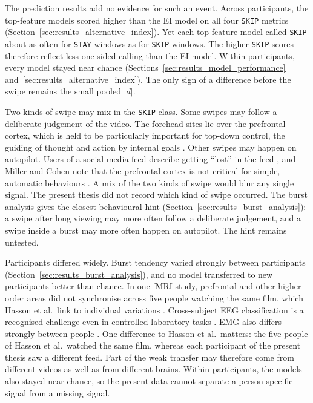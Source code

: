 \documentclass[12pt,a4paper]{report}
\begin{document}
The prediction results add no evidence for such an event. Across participants, the top-feature models scored higher than the EI model on all four \texttt{SKIP} metrics (Section~\ref{sec:results_alternative_index}). Yet each top-feature model called \texttt{SKIP} about as often for \texttt{STAY} windows as for \texttt{SKIP} windows. The higher \texttt{SKIP} scores therefore reflect less one-sided calling than the EI model. Within participants, every model stayed near chance (Sections~\ref{sec:results_model_performance} and~\ref{sec:results_alternative_index}). The only sign of a difference before the swipe remains the small pooled \(|d|\).

Two kinds of swipe may mix in the \texttt{SKIP} class. Some swipes may follow a deliberate judgement of the video. The forehead sites lie over the prefrontal cortex, which is held to be particularly important for top-down control, the guiding of thought and action by internal goals \cite{miller_integrative_2001}. Other swipes may happen on autopilot. Users of a social media feed describe getting ``lost'' in the feed \cite{baughan_i_2022}, and Miller and Cohen note that the prefrontal cortex is not critical for simple, automatic behaviours \cite{miller_integrative_2001}. A mix of the two kinds of swipe would blur any single signal. The present thesis did not record which kind of swipe occurred. The burst analysis gives the closest behavioural hint (Section~\ref{sec:results_burst_analysis}): a swipe after long viewing may more often follow a deliberate judgement, and a swipe inside a burst may more often happen on autopilot. The hint remains untested.

Participants differed widely. Burst tendency varied strongly between participants (Section~\ref{sec:results_burst_analysis}), and no model transferred to new participants better than chance. In one fMRI study, prefrontal and other higher-order areas did not synchronise across five people watching the same film, which Hasson et al.\ link to individual variations \cite{hasson_intersubject_2004}. Cross-subject EEG classification is a recognised challenge even in controlled laboratory tasks \cite{apicella_eeg-based_2022, bellos_methods_2025}. EMG also differs strongly between people \cite{mcmenamin_electromyogenic_2011}. One difference to Hasson et al.\ matters: the five people of Hasson et al.\ watched the same film, whereas each participant of the present thesis saw a different feed. Part of the weak transfer may therefore come from different videos as well as from different brains. Within participants, the models also stayed near chance, so the present data cannot separate a person-specific signal from a missing signal.
\end{document}
